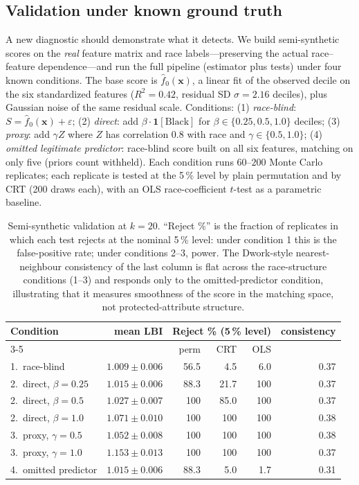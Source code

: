 \documentclass[11pt]{article}
\begin{document}
\subsection{Validation under known ground truth}
\label{sec:synthetic}

A new diagnostic should demonstrate what it detects. We build
semi-synthetic scores on the \emph{real} feature matrix and race
labels---preserving the actual race--feature dependence---and run the
full pipeline (estimator plus tests) under four known conditions. The
base score is $\hat{f}_0(\mathbf{x})$, a linear fit of the observed
decile on the six standardized features ($R^2 = 0.42$, residual SD
$\sigma = 2.16$ deciles), plus Gaussian noise of the same residual
scale. Conditions: (1) \emph{race-blind}: $S = \hat{f}_0(\mathbf{x})
+ \varepsilon$; (2) \emph{direct}: add $\beta \cdot
\mathbf{1}[\text{Black}]$ for $\beta \in \{0.25, 0.5, 1.0\}$ deciles;
(3) \emph{proxy}: add $\gamma Z$ where $Z$ has correlation $0.8$
with race and $\gamma \in \{0.5, 1.0\}$; (4) \emph{omitted
legitimate predictor}: race-blind score built on all six features,
matching on only five (priors count withheld). Each condition runs
$60$--$200$ Monte Carlo replicates; each replicate is tested at the
5\,\% level by plain permutation and by CRT (200 draws each), with an
OLS race-coefficient $t$-test as a parametric baseline.

\begin{table}[h]
\centering
\caption{Semi-synthetic validation at $k = 20$. ``Reject \%'' is the
fraction of replicates in which each test rejects at the nominal
5\,\% level: under condition 1 this is the false-positive rate;
under conditions 2--3, power. The Dwork-style nearest-neighbour
consistency of the last column is flat across the race-structure
conditions (1--3) and responds only to the omitted-predictor
condition, illustrating that it measures smoothness of the score in
the matching space, not protected-attribute structure.}
\label{tab:synthetic}
\begin{tabular}{lrrrrr}
\toprule
\textbf{Condition} & \textbf{mean LBI} &
\multicolumn{3}{c}{\textbf{Reject \% (5\,\% level)}} &
\textbf{consistency} \\
\cmidrule(lr){3-5}
 & & perm & CRT & OLS & \\
\midrule
1.\ race-blind & $1.009 \pm 0.006$ & 56.5 & 4.5 & 6.0 & 0.37 \\
2.\ direct, $\beta = 0.25$ & $1.015 \pm 0.006$ & 88.3 & 21.7 & 100 & 0.37 \\
2.\ direct, $\beta = 0.5$ & $1.027 \pm 0.007$ & 100 & 85.0 & 100 & 0.37 \\
2.\ direct, $\beta = 1.0$ & $1.071 \pm 0.010$ & 100 & 100 & 100 & 0.38 \\
3.\ proxy, $\gamma = 0.5$ & $1.052 \pm 0.008$ & 100 & 100 & 100 & 0.38 \\
3.\ proxy, $\gamma = 1.0$ & $1.153 \pm 0.013$ & 100 & 100 & 100 & 0.37 \\
4.\ omitted predictor & $1.015 \pm 0.006$ & 88.3 & 5.0 & 1.7 & 0.31 \\
\bottomrule
\end{tabular}
\end{table}
\end{document}

